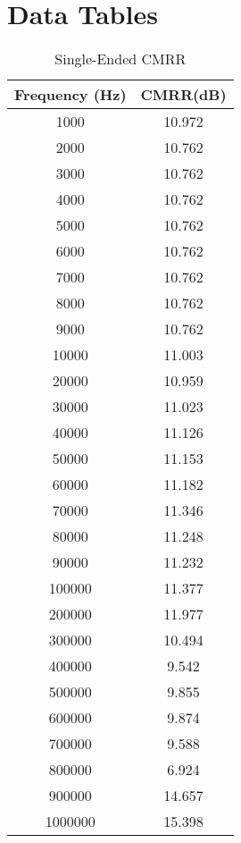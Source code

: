 \appendix
\section{Data Tables}
\setcounter{table}{0}
\renewcommand*\thetable{\Alph{section}.\arabic{table}}
\begin{table}[htpb]
\begin{center}
\caption{Single-Ended CMRR}
\begin{tabular}{|c|c|}
\hline
Frequency (Hz) & CMRR(dB) \\ \hline
1000&	10.972\\ \hline
2000&	10.762\\ \hline
3000&	10.762\\ \hline
4000&	10.762\\ \hline
5000&	10.762\\ \hline
6000&	10.762\\ \hline
7000&	10.762\\ \hline
8000&	10.762\\ \hline
9000&	10.762\\ \hline
10000&	11.003\\ \hline
20000&	10.959\\ \hline
30000&	11.023\\ \hline
40000&	11.126\\ \hline
50000&	11.153\\ \hline
60000&	11.182\\ \hline
70000&	11.346\\ \hline
80000&	11.248\\ \hline
90000&	11.232\\ \hline
100000&	11.377\\ \hline
200000&	11.977\\ \hline
300000&	10.494\\ \hline
400000&	9.542\\ \hline
500000&	9.855\\ \hline
600000&	9.874\\ \hline
700000&	9.588\\ \hline
800000&	6.924\\ \hline
900000&	14.657\\ \hline
1000000&15.398\\ \hline


\end{tabular}
\label{CDgaindata}
\end{center}
\end{table}
